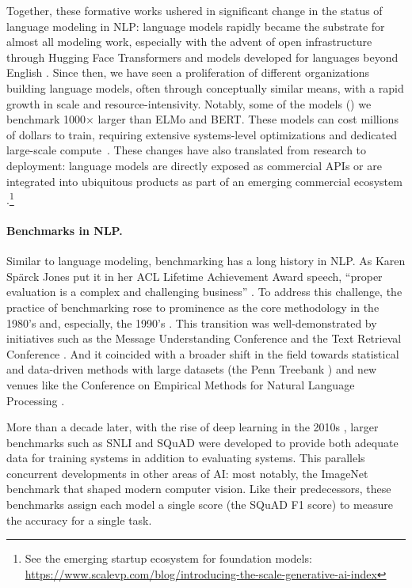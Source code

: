 Together, these formative works ushered in significant change in the status of language modeling in NLP: language models rapidly became the substrate for almost all modeling work, especially with the advent of open infrastructure through Hugging Face Transformers \citep{wolf2019transformers} and models developed for languages beyond English \citep[\eg multilingual-BERT, XLM;][]{devlin2019bert, conneau2019cross}.
Since then, we have seen a proliferation of different organizations building language models, often through conceptually similar means, with a rapid growth in scale and resource-intensivity.
Notably, some of the models (\eg \mtnlgfivethreezero) we benchmark  1000$\times$ larger than ELMo and BERT.
These models can cost millions of dollars to train, requiring extensive systems-level optimizations and dedicated large-scale compute~\citep{narayanan2021efficient}.
These changes have also translated from research to deployment: language models are directly exposed as commercial APIs or are integrated into ubiquitous products \citep[see][\S5]{bommasani2022homogenization} as part of an emerging commercial ecosystem \citep[][\S1.2]{bommasani2021opportunities}.\footnote{See the emerging startup ecosystem for foundation models: \url{https://www.scalevp.com/blog/introducing-the-scale-generative-ai-index}}

\paragraph{Benchmarks in NLP.}
Similar to language modeling, benchmarking has a long history in NLP.
As Karen Sp{\"a}rck Jones put it in her ACL Lifetime Achievement Award speech, ``proper evaluation is a complex and challenging business'' \citep{jones2005acl}.
To address this challenge, the practice of benchmarking rose to prominence as the core methodology in the 1980's and, especially, the 1990's \citep[see][]{liberman2010obituary, jones1995evaluating}.
This transition was well-demonstrated by initiatives such as the Message Understanding Conference \citep[MUC;][]{grishman1996muc} and the Text Retrieval Conference \cite[TREC;][]{voorhees1998trec}.
And it coincided with a broader shift in the field towards statistical and data-driven methods with large datasets (\eg the Penn Treebank \citep{marcus1999ptb}) and new venues like the Conference on Empirical Methods for Natural Language Processing \citep{emnlp1996emnlp}. 

More than a decade later, with the rise of deep learning in the 2010s \citep{collobert2008unified, turian2010word, collobert11scratch, socher2011paraphrase, socher2011parsing, sutskever2011generating, mikolov2013efficient, pennington2014glove, sutskever2014sequence, bahdanau2015neural, luong2015translation, vaswani2017attention}, larger benchmarks such as SNLI \citep{bowman2015large} and SQuAD \citep{rajpurkar2016squad} were developed to provide both adequate data for training systems in addition to evaluating systems.
This parallels concurrent developments in other areas of AI: most notably, the ImageNet benchmark \citep{deng2009imagenet} that shaped modern computer vision.
Like their predecessors, these benchmarks assign each model a single score (\eg the SQuAD F1 score) to measure the accuracy for a single task.

